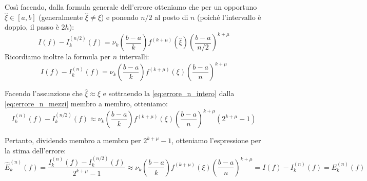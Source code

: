 \begin{center}
\end{center}

Così facendo, dalla formula generale dell'errore otteniamo che per un opportuno $\hat{\xi} \in [a,b]$ (generalmente $\hat{\xi} \neq \xi$) e ponendo $n/2$ al posto di $n$ (poiché l'intervallo è doppio, il passo è $2h$):
\begin{equation} \label{eq:errore_n_mezzi}
I(f) - I_k^{(n/2)}(f) = \nu_k \left(\frac{b-a}{k}\right) f^{(k+\mu)}(\hat{\xi}) \left(\frac{b-a}{n/2}\right)^{k+\mu}
\end{equation}
Ricordiamo inoltre la formula per $n$ intervalli:
\begin{equation} \label{eq:errore_n_intero}
I(f) - I_k^{(n)}(f) = \nu_k \left(\frac{b-a}{k}\right) f^{(k+\mu)}(\xi) \left(\frac{b-a}{n}\right)^{k+\mu}
\end{equation}

Facendo l'assunzione che $\hat{\xi} \approx \xi$ e sottraendo la \eqref{eq:errore_n_intero} dalla \eqref{eq:errore_n_mezzi} membro a membro, otteniamo:
\begin{equation*}
I_k^{(n)}(f) - I_k^{(n/2)}(f) \approx \nu_k \left(\frac{b-a}{k}\right) f^{(k+\mu)}(\xi) \left(\frac{b-a}{n}\right)^{k+\mu} (2^{k+\mu} - 1)
\end{equation*}

Pertanto, dividendo membro a membro per $2^{k+\mu} - 1$, otteniamo l'espressione per la stima dell'errore:
\begin{equation} \label{eq:stima_errore_quad}
\hat{E}_k^{(n)}(f) = \frac{I_k^{(n)}(f) - I_k^{(n/2)}(f)}{2^{k+\mu} - 1} \approx \nu_k \left(\frac{b-a}{k}\right) f^{(k+\mu)}(\xi) \left(\frac{b-a}{n}\right)^{k+\mu} = I(f) - I_k^{(n)}(f) = E_k^{(n)}(f)
\end{equation}

